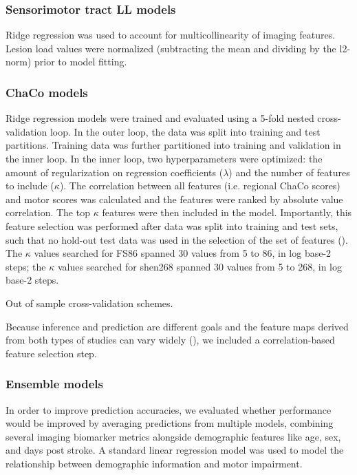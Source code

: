 \documentclass[10pt]{article}
\begin{document}
\subsubsection{Sensorimotor tract LL models}
Ridge regression was used to account for multicollinearity of imaging features. Lesion load values were normalized (subtracting the mean and dividing by the l2-norm) prior to model fitting.

\subsubsection{ChaCo models}


Ridge regression models were trained and evaluated using a 5-fold nested cross-validation loop. In the outer loop, the data was split into training and test partitions. Training data was further partitioned into training and validation in the inner loop. In the inner loop, two hyperparameters were optimized: the amount of regularization on regression coefficients ($\lambda$) and the number of features to include ($\kappa$). The correlation between all features (i.e. regional ChaCo scores) and motor scores was calculated and the features were ranked by absolute value correlation. The top $\kappa$ features were then included in the model. Importantly, this feature selection was performed after data was split into training and test sets, such that no hold-out test data was used in the selection of the set of features (\cite{Hastie2001-or}). The $\kappa$ values searched for FS86 spanned 30 values from 5 to 86, in log base-2 steps; the $\kappa$ values searched for shen268 spanned 30 values from 5 to 268, in log base-2 steps. 

Out of sample cross-validation schemes.

Because inference and prediction are different goals and the feature maps derived from both types of studies can vary widely (\cite{Sperber2021-lw, Bzdok2020-py}), we included a correlation-based feature selection step. 


\subsubsection{Ensemble models}
In order to improve prediction accuracies, we evaluated whether performance would be improved by averaging predictions from multiple models, combining several imaging biomarker metrics alongside demographic features like age, sex, and days post stroke. A standard linear regression model was used to model the relationship between demographic information and motor impairment. 
\end{document}
